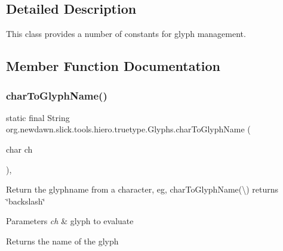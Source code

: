 \subsection{Detailed Description}
This class provides a number of constants for glyph management. 

\subsection{Member Function Documentation}
\mbox{\label{classorg_1_1newdawn_1_1slick_1_1tools_1_1hiero_1_1truetype_1_1_glyphs_a717eae640170c2ff964fc1414970b51f}} 
\subsubsection{\texorpdfstring{char\+To\+Glyph\+Name()}{charToGlyphName()}}
{\footnotesize\ttfamily static final String org.\+newdawn.\+slick.\+tools.\+hiero.\+truetype.\+Glyphs.\+char\+To\+Glyph\+Name (\begin{DoxyParamCaption}\item[{char}]{ch }\end{DoxyParamCaption})\hspace{0.3cm}{\ttfamily [inline]}, {\ttfamily [static]}}

Return the glyphname from a character, eg, char\+To\+Glyph\+Name(\textquotesingle{}\textbackslash{}\textquotesingle{}) returns \char`\"{}backslash\char`\"{}


\begin{DoxyParams}{Parameters}
{\em ch} & glyph to evaluate \\
\hline
\end{DoxyParams}
\begin{DoxyReturn}{Returns}
the name of the glyph 
\end{DoxyReturn}

